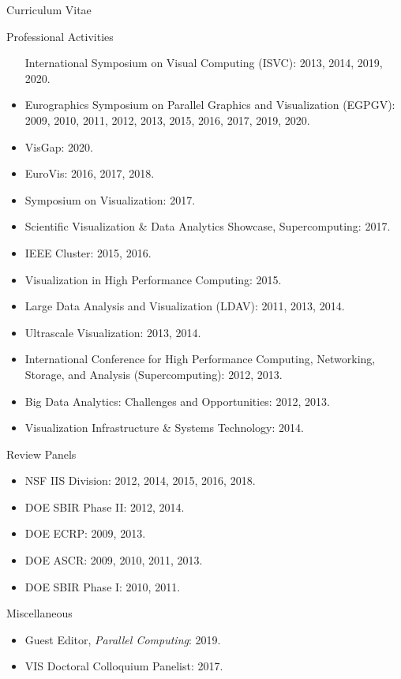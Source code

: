 \documentclass{article}
\begin{document}
\begin{cv}{Curriculum Vitae}
\begin{cvlist}{Professional Activities}
\begin{itemize}
        International Symposium on Visual Computing (ISVC): 2013, 2014, 2019, 2020.
      \item
        Eurographics Symposium on Parallel Graphics and Visualization (EGPGV): 2009, 2010, 2011, 2012, 2013, 2015, 2016, 2017, 2019, 2020.
      \item
        VisGap: 2020.
      \item
        EuroVis: 2016, 2017, 2018.
      \item
        Symposium on Visualization: 2017.
      \item
        Scientific Visualization \& Data Analytics Showcase, Supercomputing: 2017.
      \item
        IEEE Cluster: 2015, 2016.
      \item
        Visualization in High Performance Computing: 2015.
      \item
        Large Data Analysis and Visualization (LDAV): 2011, 2013, 2014.
      \item
        Ultrascale Visualization: 2013, 2014.
      \item
        International Conference for High Performance Computing, Networking, Storage, and Analysis (Supercomputing): 2012, 2013.
      \item
        Big Data Analytics: Challenges and Opportunities: 2012, 2013.
      \item
        Visualization Infrastructure \& Systems Technology: 2014.
      \end{itemize}
    \item[Review Panels]~\\
      \begin{itemize}
      \item
        NSF IIS Division: 2012, 2014, 2015, 2016, 2018.
      \item
        DOE SBIR Phase II: 2012, 2014.
      \item
        DOE ECRP: 2009, 2013.
      \item
        DOE ASCR: 2009, 2010, 2011, 2013.
      \item
        DOE SBIR Phase I: 2010, 2011.
      \end{itemize}
    \item[Miscellaneous]~\\
      \begin{itemize}
      \item
        Guest Editor, \emph{Parallel Computing}: 2019.
      \item
        VIS Doctoral Colloquium Panelist: 2017.
      \end{itemize}
    \end{cvlist}

  \end{cv}
\end{document}
